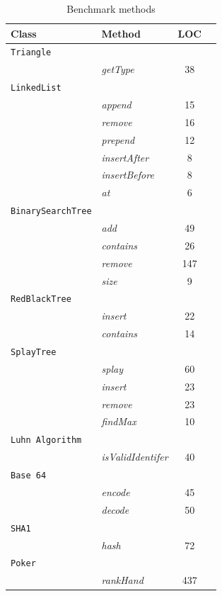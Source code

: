 \begin{table}[h]
\centering
\begin{tabular}{|l|l|c|c|}
\hline
\textbf{Class} & \textbf{Method} & \textbf{LOC} \\
\hline
\texttt{Triangle} & & \\
           & \textit{getType} & 38      \\
\hline
\texttt{LinkedList} & & \\
           & \textit{append} & 15       \\
           & \textit{remove} & 16       \\
           & \textit{prepend} & 12      \\
           & \textit{insertAfter} & 8   \\
           & \textit{insertBefore} & 8  \\
           & \textit{at} & 6            \\
\hline
\texttt{BinarySearchTree} & &     \\
           & \emph{add} & 49      \\
           & \emph{contains} & 26 \\
           & \emph{remove} & 147  \\
           & \emph{size} & 9      \\
\hline
\texttt{RedBlackTree} & &         \\
           & \emph{insert} & 22   \\
           & \emph{contains} & 14 \\
\hline
\texttt{SplayTree} & &             \\
           & \emph{splay} & 60 \\
           & \emph{insert} & 23 \\
           & \emph{remove} & 23 \\
           & \emph{findMax} & 10 \\
\hline
\texttt{Luhn Algorithm} & &     \\
           & \emph{isValidIdentifer} & 40 \\
\hline
\texttt{Base 64} & &     \\
           & \emph{encode} & 45 \\
           & \emph{decode} & 50 \\
\hline
\texttt{SHA1} & &             \\
           & \emph{hash} & 72 \\
\hline
\texttt{Poker} & &                 \\
           & \emph{rankHand} & 437 \\
\hline
\end{tabular}
\caption{Benchmark methods}
\label{benchmarktests}
\end{table}

